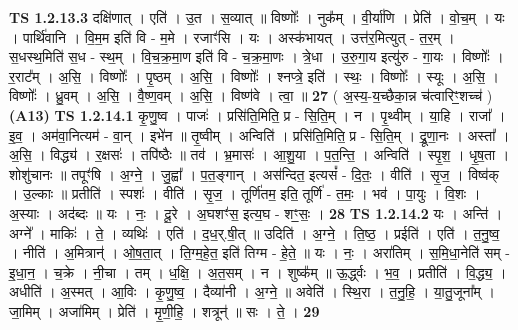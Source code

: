 \documentclass[17pt]{extarticle}
\begin{document}
                  \newline
                                \textbf{ TS 1.2.13.3} \newline
                  दक्षि॑णात् । एति॑ । उ॒त । स॒व्यात् ॥ विष्णोः᳚ । नुक᳚म् । वी॒र्या॑णि । प्रेति॑ । वो॒च॒म् । यः । पार्थि॑वानि । वि॒म॒म इति॑ वि - म॒मे । रजाꣳ॑सि । यः । अस्क॑भायत् । उत्त॑र॒मित्युत् - त॒र॒म् । स॒धस्थ॒मिति॑ स॒ध - स्थ॒म् । वि॒च॒क्र॒मा॒ण इति॑ वि - च॒क्र॒मा॒णः । त्रे॒धा । उ॒रु॒गा॒य इत्यु॑रु - गा॒यः । विष्णोः᳚ । र॒राट᳚म् । अ॒सि॒ । विष्णोः᳚ । पृ॒ष्ठम् । अ॒सि॒ । विष्णोः᳚ । श्नप्त्रे॒ इति॑ । स्थः॒ । विष्णोः᳚ । स्यूः । अ॒सि॒ । विष्णोः᳚ । ध्रु॒वम् । अ॒सि॒ । वै॒ष्ण॒वम् । अ॒सि॒ । विष्ण॑वे । त्वा॒ ॥ \textbf{  27} \newline
                  \newline
                      ( अ॒स्य॒-य॒च्छैका॒न्न च॑त्वारिꣳ॒॒शच्च॑ )  \textbf{(A13)} \newline \newline
                                \textbf{ TS 1.2.14.1} \newline
                  कृ॒णु॒ष्व । पाजः॑ । प्रसि॑ति॒मिति॒ प्र - सि॒ति॒म् । न । पृ॒थ्वीम् । या॒हि । राजा᳚ । इ॒व॒ । अम॑वा॒नित्यम॑ - वा॒न् । इभे॑न ॥ तृ॒ष्वीम् । अन्विति॑ । प्रसि॑ति॒मिति॒ प्र - सि॒ति॒म् । द्रू॒णा॒नः । अस्ता᳚ । अ॒सि॒ । विद्ध्य॑ । र॒क्षसः॑ । तपि॑ष्ठैः ॥ तव॑ । भ्र॒मासः॑ । आ॒शु॒या । प॒त॒न्ति॒ । अन्विति॑ । स्पृ॒श॒ । धृ॒ष॒ता । शोशु॑चानः ॥ तपूꣳ॑षि । अ॒ग्ने॒ । जु॒ह्वा᳚ । प॒त॒ङ्गान् । अस॑न्दित॒ इत्यसं᳚ - दि॒तः॒ । वीति॑ । सृ॒ज॒ । विष्व॑क् । उ॒ल्काः ॥ प्रतीति॑ । स्पशः॑ । वीति॑ । सृ॒ज॒ । तूर्णि॑तम॒ इति॒ तूर्णि॑ - त॒मः॒ । भव॑ । पा॒युः । वि॒शः । अ॒स्याः । अद॑ब्दः ॥ यः । नः॒ । दू॒रे । अ॒घशꣳ॑स॒ इत्य॒घ - शꣳ॒॒सः॒ । \textbf{  28} \newline
                  \newline
                                \textbf{ TS 1.2.14.2} \newline
                  यः । अन्ति॑ । अग्ने᳚ । माकिः॑ । ते॒ । व्यथिः॑ । एति॑ । द॒ध॒र्.षी॒त् ॥ उदिति॑ । अ॒ग्ने॒ । ति॒ष्ठ॒ । प्रईति॑ । एति॑ । त॒नु॒ष्व॒ । नीति॑ । अ॒मित्रान्॑ । ओ॒ष॒ता॒त् । ति॒ग्म॒हे॒त॒ इति॑ तिग्म - हे॒ते॒ ॥ यः । नः॒ । अरा॑तिम् । स॒मि॒धा॒नेति॑ सम् - इ॒धा॒न॒ । च॒क्रे । नी॒चा । तम् । ध॒क्षि॒ । अ॒त॒सम् । न । शुष्क᳚म् ॥ ऊ॒र्द्ध्वः । भ॒व॒ । प्रतीति॑ । वि॒द्ध्य॒ । अधीति॑ । अ॒स्मत् । आ॒विः । कृ॒णु॒ष्व॒ । दैव्या॑नी । अ॒ग्ने॒ ॥ अवेति॑ । स्थि॒रा । त॒नु॒हि॒ । या॒तु॒जूना᳚म् । जा॒मिम् । अजा॑मिम् । प्रेति॑ । मृ॒णी॒हि॒ । शत्रून्॑ ॥ सः । ते॒ । \textbf{  29} \newline
                  \newline
\end{document}
